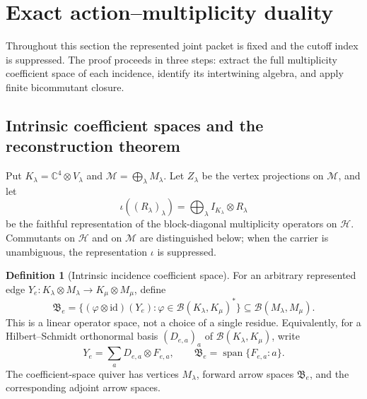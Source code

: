 \documentclass[11pt]{article}
\numberwithin{equation}{section}
\theoremstyle{definition}
\newtheorem{definition}[theorem]{Definition}
\theoremstyle{remark}
\newcommand{\C}{\mathbb C}
\newcommand{\id}{\mathrm{id}}
\newcommand{\Span}{\operatorname{span}}
\newcommand{\Hh}{\mathcal H}
\begin{document}
\section{Exact action--multiplicity duality}
\label{sec:finite-duality}

Throughout this section the represented joint packet is fixed and the cutoff
index is suppressed.  The proof proceeds in three steps: extract the full
multiplicity coefficient space of each incidence, identify its intertwining
algebra, and apply finite bicommutant closure.


\subsection{Intrinsic coefficient spaces and the reconstruction theorem}

Put $K_\lambda=\C^4\otimes V_\lambda$ and
$\mathscr M=\bigoplus_\lambda M_\lambda$.  Let $Z_\lambda$ be the
vertex projections on $\mathscr M$, and let
\[
 \iota((R_\lambda)_\lambda)
 =\bigoplus_\lambda I_{K_\lambda}\otimes R_\lambda
\]
be the faithful representation of the block-diagonal multiplicity operators
on $\Hh$.  Commutants on $\Hh$ and on $\mathscr M$ are distinguished below;
when the carrier is unambiguous, the representation $\iota$ is suppressed.

\begin{definition}[Intrinsic incidence coefficient space]
\label{def:incidence-coefficients}
For an arbitrary represented edge
$Y_e:K_\lambda\otimes M_\lambda\to K_\mu\otimes M_\mu$, define
\begin{equation}
 \mathfrak B_e
 =\{(\varphi\otimes\id)(Y_e):
     \varphi\in\mathcal B(K_\lambda,K_\mu)^*\}
 \subseteq\mathcal B(M_\lambda,M_\mu).
 \label{eq:intrinsic-incidence-coefficients}
\end{equation}
This is a linear operator space, not a choice of a single residue.
Equivalently, for a Hilbert--Schmidt orthonormal basis
$(D_{e,a})_a$ of $\mathcal B(K_\lambda,K_\mu)$, write
\begin{equation}
 Y_e=\sum_a D_{e,a}\otimes F_{e,a},
 \qquad \mathfrak B_e=\Span\{F_{e,a}:a\}.
 \label{eq:general-incidence-expansion}
\end{equation}
The coefficient-space quiver has vertices $M_\lambda$, forward arrow
spaces $\mathfrak B_e$, and the corresponding adjoint arrow spaces.
\end{definition}
\end{document}
